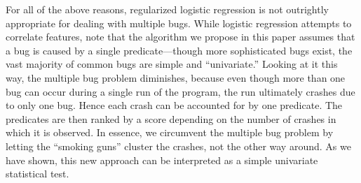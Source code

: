 For all of the above reasons, regularized logistic regression is not
outrightly appropriate for dealing with multiple bugs.  While logistic
regression attempts to correlate features, note that the algorithm we
propose in this paper assumes that a bug is caused by a single
predicate---though more sophisticated bugs exist, the vast majority of
common bugs are simple and ``univariate.''  Looking at it this way,
the multiple bug problem diminishes, because even though more than one
bug can occur during a single run of the program, the run ultimately
crashes due to only one bug.  Hence each crash can be accounted for by
one predicate.  The predicates are then ranked by a score depending on
the number of crashes in which it is observed.  In essence, we
circumvent the multiple bug problem by letting the ``smoking guns''
cluster the crashes, not the other way around.  As we have shown, this
new approach can be interpreted as a simple univariate statistical
test.


